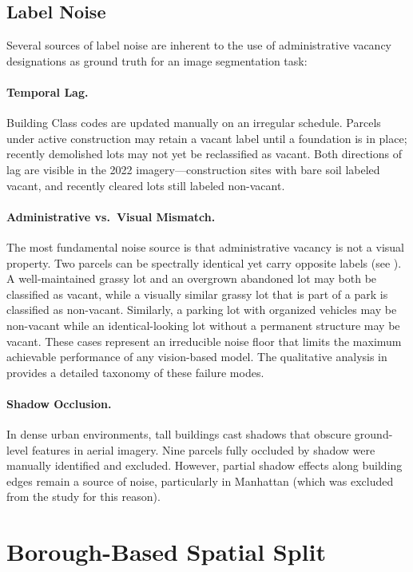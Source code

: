 \subsection{Label Noise}

Several sources of label noise are inherent to the use of administrative vacancy designations as ground truth for an image segmentation task:

\paragraph{Temporal Lag.} Building Class codes are updated manually on an irregular schedule. Parcels under active construction may retain a vacant label until a foundation is in place; recently demolished lots may not yet be reclassified as vacant. Both directions of lag are visible in the 2022 imagery---construction sites with bare soil labeled vacant, and recently cleared lots still labeled non-vacant.

\paragraph{Administrative vs.\ Visual Mismatch.} The most fundamental noise source is that administrative vacancy is not a visual property. Two parcels can be spectrally identical yet carry opposite labels (see ). A well-maintained grassy lot and an overgrown abandoned lot may both be classified as vacant, while a visually similar grassy lot that is part of a park is classified as non-vacant. Similarly, a parking lot with organized vehicles may be non-vacant while an identical-looking lot without a permanent structure may be vacant. These cases represent an irreducible noise floor that limits the maximum achievable performance of any vision-based model. The qualitative analysis in  provides a detailed taxonomy of these failure modes.

\paragraph{Shadow Occlusion.} In dense urban environments, tall buildings cast shadows that obscure ground-level features in aerial imagery. Nine parcels fully occluded by shadow were manually identified and excluded. However, partial shadow effects along building edges remain a source of noise, particularly in Manhattan (which was excluded from the study for this reason).

\section{Borough-Based Spatial Split}
\label{sec:borough_split}

